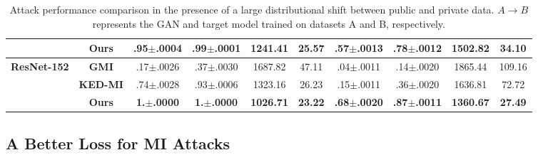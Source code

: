 \documentclass[letterpaper]{article} %
\begin{document}
\begin{table}[ht!]
{\begin{tabular}{@{}cccccccccc@{}}
                                          & \textbf{Ours}   & \textbf{.95$\pm$.0004}               & \textbf{.99$\pm$.0001}               & \textbf{1241.41}               & \textbf{25.57}           & \textbf{.57$\pm$.0013}             & \textbf{.78$\pm$.0012}                & \textbf{1502.82}              & \textbf{34.10}           \\ \midrule
    \multirow{3}{*}{\textbf{ResNet-152}}  & \textbf{GMI}    & .17$\pm$.0026                        & .37$\pm$.0030                        & 1687.82                        & 47.11                    & .04$\pm$.0011                      & .14$\pm$.0020                         & 1865.44                       & 109.16                   \\
                                          & \textbf{KED-MI} & .74$\pm$.0028                        & .93$\pm$.0006                        & 1323.16                        & 26.23                    & .15$\pm$.0011                      & .36$\pm$.0020                         & 1636.81                       & 72.72                    \\
                                          & \textbf{Ours}   & \textbf{1.$\pm$.0000}                & \textbf{1.$\pm$.0000}                & \textbf{1026.71}               & \textbf{23.22}           & \textbf{.68$\pm$.0020}             & \textbf{.87$\pm$.0011}                & \textbf{1360.67}              & \textbf{27.49}           \\ \bottomrule
\end{tabular}
}
\caption{Attack performance comparison in the presence of a large distributional shift between public and private data. $A \rightarrow B$ represents the GAN and target model trained on datasets A and B, respectively.}
\label{tab: cross_dataset_results}
\end{table}
    
   
\subsection{A Better Loss for MI Attacks}
	
\end{document}
